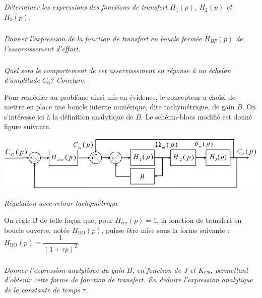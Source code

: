 \documentclass[10pt,fleqn]{article} %
\begin{document}
\subparagraph{}
\textit{Déterminer les expressions des fonctions de transfert $H_1(p)$, $H_2(p)$ et $H_3(p)$.}
\ifprof
\begin{corrige}
\end{corrige}
\else
\fi

\subparagraph{}
\textit{Donner l’expression de la fonction de transfert en boucle fermée $H_{BF}(p)$ de l’asservissement
d’effort.}

\ifprof
\begin{corrige}
\end{corrige}
\else
\fi

\subparagraph{}
\textit{Quel sera le comportement de cet asservissement en réponse à un échelon d'amplitude $C_0$?
Conclure.}
\ifprof
\begin{corrige}
\end{corrige}
\else
\fi

\vspace{.25cm}

Pour remédier au problème ainsi mis en évidence, le concepteur a choisi de mettre en place une boucle
interne numérique, dite tachymétrique, de gain $B$. On s’intéresse ici à la définition analytique de $B$.
Le schéma-blocs modifié est donné figure suivante.


\begin{center}
\includegraphics[width=.7\linewidth]{images/Sujet/images/fig_07}

\textit{Régulation avec retour tachymétrique}
\end{center}


On règle B de telle façon que, pour $H_{\text{cor}}(p)=1$, la fonction de transfert en boucle ouverte, notée $H_{\text{BO}}(p)$, puisse être mise sous la forme suivante : 
$H_{\text{BO}}(p)=\dfrac{1}{\left(1+\tau p\right)^2}$.



\subparagraph{}
\textit{Donner l’expression analytique du gain $B$, en fonction de $J$ et $K_{C\theta}$, permettant d’obtenir cette
forme de fonction de transfert. En déduire l’expression analytique de la constante de temps $\tau$.}
\ifprof
\begin{corrige}
\end{corrige}
\else
\fi

\vspace{.25cm}
\end{document}
